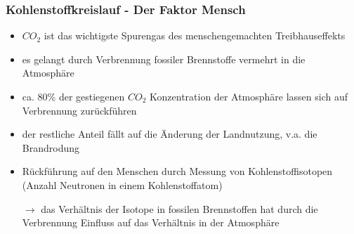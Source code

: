\begin{frame}
	\frametitle{Kohlenstoffkreislauf - Der Faktor Mensch}
	\begin{itemize}
		\item $CO_2$ ist das wichtigste Spurengas des menschengemachten Treibhauseffekts
		\item es gelangt durch Verbrennung fossiler Brennstoffe vermehrt in die Atmosphäre
		\item ca. 80\% der gestiegenen $CO_2$ Konzentration der Atmosphäre lassen sich auf Verbrennung zurückführen
		\item der restliche Anteil fällt auf die Änderung der Landnutzung, v.a. die Brandrodung
		\item Rückführung auf den Menschen durch Messung von Kohlenstoffisotopen (Anzahl Neutronen in einem Kohlenstoffatom)
		\item [$\rightarrow$] das Verhältnis der Isotope in fossilen Brennstoffen hat durch die Verbrennung Einfluss auf das Verhältnis in der Atmosphäre
	\end{itemize}
\end{frame}


